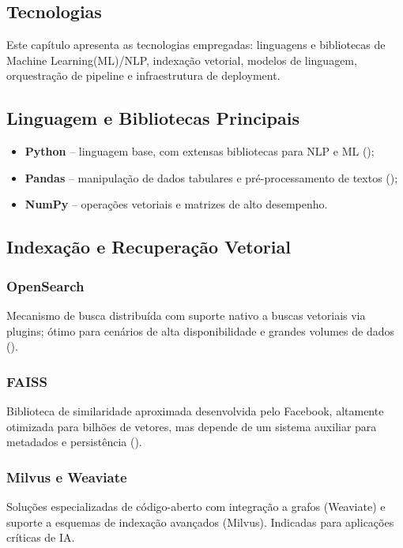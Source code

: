 \begin{description}
\chapter{Tecnologias}
\label{chap:tecnologias}
Este capítulo apresenta as tecnologias empregadas: linguagens e bibliotecas de Machine Learning(ML)/NLP, indexação vetorial, modelos de linguagem, orquestração de pipeline e infraestrutura de deployment.  
\section{Linguagem e Bibliotecas Principais}
\begin{itemize}[label=\textbullet]
  \item \textbf{Python} – linguagem base, com extensas bibliotecas para NLP e ML (\cite{python2024reference});
  \item \textbf{Pandas} – manipulação de dados tabulares e pré-processamento de textos (\cite{pandas2024});
  \item \textbf{NumPy} – operações vetoriais e matrizes de alto desempenho.
\end{itemize}

\section{Indexação e Recuperação Vetorial}
\subsection{OpenSearch}
Mecanismo de busca distribuída com suporte nativo a buscas vetoriais via plugins; ótimo para cenários de alta disponibilidade e grandes volumes de dados (\cite{taipalus2024vector}).

\subsection{FAISS}
Biblioteca de similaridade aproximada desenvolvida pelo Facebook, altamente otimizada para bilhões de vetores, mas depende de um sistema auxiliar para metadados e persistência (\cite{facebook2024faiss}).

\subsection{Milvus e Weaviate}
Soluções especializadas de código-aberto com integração a grafos (Weaviate) e suporte a esquemas de indexação avançados (Milvus). Indicadas para aplicações críticas de IA.


\end{description}
